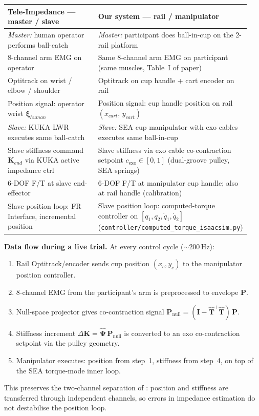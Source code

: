 \documentclass[11pt, a4paper]{article}
\begin{document}
\begin{center}
\begin{tabular}{p{0.44\linewidth}p{0.50\linewidth}}
\toprule
\textbf{Tele-Impedance --- master / slave} & \textbf{Our system --- rail / manipulator}\\
\midrule
\textit{Master:} human operator performs ball-catch
  & \textit{Master:} participant does ball-in-cup on the 2-rail platform \\
8-channel arm EMG on operator
  & Same 8-channel arm EMG on participant (same muscles, Table~I of paper) \\
Optitrack on wrist / elbow / shoulder
  & Optitrack on cup handle + cart encoder on rail \\
Position signal: operator wrist \(\boldsymbol{\xi}_{human}\)
  & Position signal: cup handle position on rail \((x_{cart},\,y_{cart})\) \\
\textit{Slave:} KUKA LWR executes same ball-catch
  & \textit{Slave:} SEA cup manipulator with exo cables executes same ball-in-cup \\
Slave stiffness command \(\mathbf{K}_{end}\) via KUKA active impedance ctrl
  & Slave stiffness via exo cable co-contraction setpoint
    \(c_{\text{exo}}\in[0,1]\) (dual-groove pulley, SEA springs) \\
6-DOF F/T at slave end-effector
  & 6-DOF F/T at manipulator cup handle; also at rail handle (calibration) \\
Slave position loop: FR Interface, incremental position
  & Slave position loop: computed-torque controller on
    \([q_1,q_2,\dot q_1,\dot q_2]\) (\texttt{controller/computed\_torque\_isaacsim.py}) \\
\bottomrule
\end{tabular}
\end{center}

\textbf{Data flow during a live trial.}
At every control cycle ($\sim$200\,Hz):
\begin{enumerate}[nosep]
  \item Rail Optitrack/encoder sends cup position \((x_c,y_c)\) to the
        manipulator position controller.
  \item 8-channel EMG from the participant's arm is preprocessed to
        envelope \(\mathbf P\).
  \item Null-space projector gives co-contraction signal
        \(\mathbf P_{\text{null}} = (\mathbf I - \hat{\mathbf T}^+
        \hat{\mathbf T})\,\mathbf P\).
  \item Stiffness increment
        \(\Delta\mathbf K = \hat{\boldsymbol\Psi}\,\mathbf P_{\text{null}}\)
        is converted to an exo co-contraction setpoint via the pulley geometry.
  \item Manipulator executes: position from step~1, stiffness from step~4,
        on top of the SEA torque-mode inner loop.
\end{enumerate}
This preserves the two-channel separation of
\citet{ajoudani2012icra}: position and stiffness are transferred through
independent channels, so errors in impedance estimation do not destabilise
the position loop.
\end{document}
